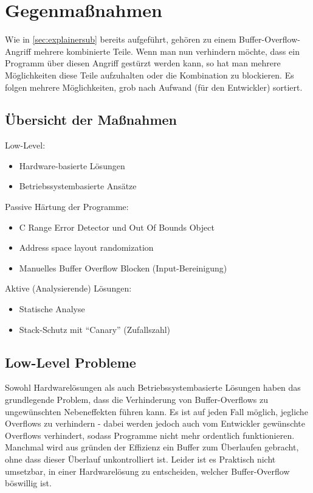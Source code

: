 \pagebreak
\section{Gegenmaßnahmen}
Wie in \autoref{sec:explainersub} bereits aufgeführt,
gehören zu einem Buffer-Overflow-Angriff mehrere kombinierte Teile. Wenn
man nun verhindern möchte, dass ein Programm über diesen Angriff gestürzt werden
kann, so hat man mehrere Möglichkeiten diese Teile aufzuhalten oder die Kombination
zu blockieren. \cite{Werthmann2006SurveyOB} Es folgen mehrere Möglichkeiten, grob nach Aufwand (für den Entwickler) sortiert.
\subsection{Übersicht der Maßnahmen}
Low-Level:
\begin{itemize}
    \item Hardware-basierte Lösungen
    \item Betriebssystembasierte Ansätze
\end{itemize}
Passive Härtung der Programme:
\begin{itemize}
    \item C Range Error Detector und Out Of Bounds Object
    \item Address space layout randomization
    \item Manuelles Buffer Overflow Blocken (Input-Bereinigung)
\end{itemize}
Aktive (Analysierende) Lösungen:
\begin{itemize}
    \item Statische Analyse
    \item Stack-Schutz mit ``Canary'' (Zufallszahl)
\end{itemize}

\subsection{Low-Level Probleme}
Sowohl Hardwarelösungen als auch Betriebssystembasierte Lösungen haben
das grundlegende Problem, dass die Verhinderung von Buffer-Overflows zu
ungewünschten Nebeneffekten führen kann. Es ist auf jeden Fall möglich,
jegliche Overflows zu verhindern - dabei werden jedoch auch vom
Entwickler gewünschte Overflows verhindert, sodass Programme nicht mehr
ordentlich funktionieren. Manchmal wird aus gründen der Effizienz ein
Buffer zum Überlaufen gebracht, ohne dass dieser Überlauf unkontrolliert
ist. Leider ist es Praktisch nicht umsetzbar, in einer Hardwarelösung
zu entscheiden, welcher Buffer-Overflow böswillig ist.

